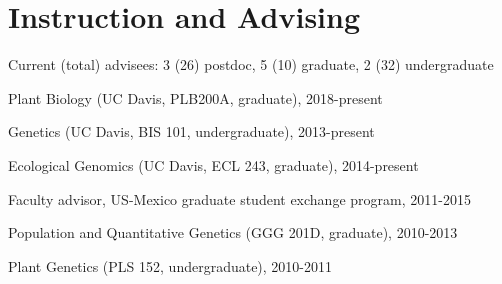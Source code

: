 \documentclass[letterpaper,10pt]{article}
\renewenvironment{itemize}{
  \begin{list}{}{
    \setlength{\leftmargin}{1.5em}
  }
}{
  \end{list}
}
\begin{document}
\section*{Instruction and Advising}
\begin{itemize}
\setlength\itemsep{0ex}
\item Current (total) advisees: 3 (26) postdoc, 5 (10) graduate, 2 (32) undergraduate

%


\item Plant Biology (UC Davis, PLB200A, graduate), 2018-present
\item Genetics (UC Davis, BIS 101, undergraduate), 2013-present
\item Ecological Genomics (UC Davis, ECL  243, graduate), 2014-present
\item Faculty advisor, US-Mexico graduate student exchange program, 2011-2015
\item Population and Quantitative Genetics (GGG 201D, graduate), 2010-2013 %
\item Plant Genetics (PLS 152, undergraduate), 2010-2011 %

\end{itemize}
\end{document}
